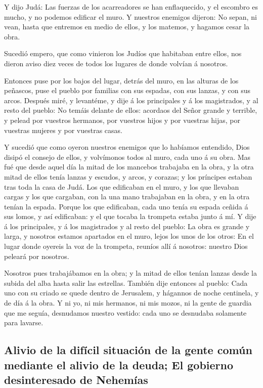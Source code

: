  Y dijo Judá: Las fuerzas de los acarreadores se han
enflaquecido, y el escombro es mucho, y no podemos edificar el muro.
 Y nuestros enemigos dijeron: No sepan, ni vean, hasta que
entremos en medio de ellos, y los matemos, y hagamos cesar la obra.

 Sucedió empero, que como vinieron los Judíos que habitaban
entre ellos, nos dieron aviso diez veces de todos los lugares de donde
volvían á nosotros.

 Entonces puse por los bajos del lugar, detrás del muro, en
las alturas de los peñascos, puse el pueblo por familias con sus
espadas, con sus lanzas, y con sus arcos.  Después miré, y
levantéme, y dije á los principales y á los magistrados, y al resto del
pueblo: No temáis delante de ellos: acordaos del Señor grande y
terrible, y pelead por vuestros hermanos, por vuestros hijos y por
vuestras hijas, por vuestras mujeres y por vuestras casas.

 Y sucedió que como oyeron nuestros enemigos que lo
habíamos entendido, Dios disipó el consejo de ellos, y volvímonos todos
al muro, cada uno á su obra.  Mas fué que desde aquel día
la mitad de los mancebos trabajaba en la obra, y la otra mitad de ellos
tenía lanzas y escudos, y arcos, y corazas; y los príncipes estaban tras
toda la casa de Judá.  Los que edificaban en el muro, y los
que llevaban cargas y los que cargaban, con la una mano trabajaban en la
obra, y en la otra tenían la espada.  Porque los que
edificaban, cada uno tenía su espada ceñida á sus lomos, y así
edificaban: y el que tocaba la trompeta estaba junto á mí. 
Y dije á los principales, y á los magistrados y al resto del pueblo: La
obra es grande y larga, y nosotros estamos apartados en el muro, lejos
los unos de los otros:  En el lugar donde oyereis la voz de
la trompeta, reuníos allí á nosotros: nuestro Dios peleará por nosotros.

 Nosotros pues trabajábamos en la obra; y la mitad de ellos
tenían lanzas desde la subida del alba hasta salir las estrellas.
 También dije entonces al pueblo: Cada uno con su criado se
quede dentro de Jerusalem, y hágannos de noche centinela, y de día á la
obra.  Y ni yo, ni mis hermanos, ni mis mozos, ni la gente
de guardia que me seguía, desnudamos nuestro vestido: cada uno se
desnudaba solamente para lavarse.

\hypertarget{alivio-de-la-difuxedcil-situaciuxf3n-de-la-gente-comuxfan-mediante-el-alivio-de-la-deuda-el-gobierno-desinteresado-de-nehemuxedas}{%
\subsection{Alivio de la difícil situación de la gente común mediante el
alivio de la deuda; El gobierno desinteresado de
Nehemías}\label{alivio-de-la-difuxedcil-situaciuxf3n-de-la-gente-comuxfan-mediante-el-alivio-de-la-deuda-el-gobierno-desinteresado-de-nehemuxedas}}

